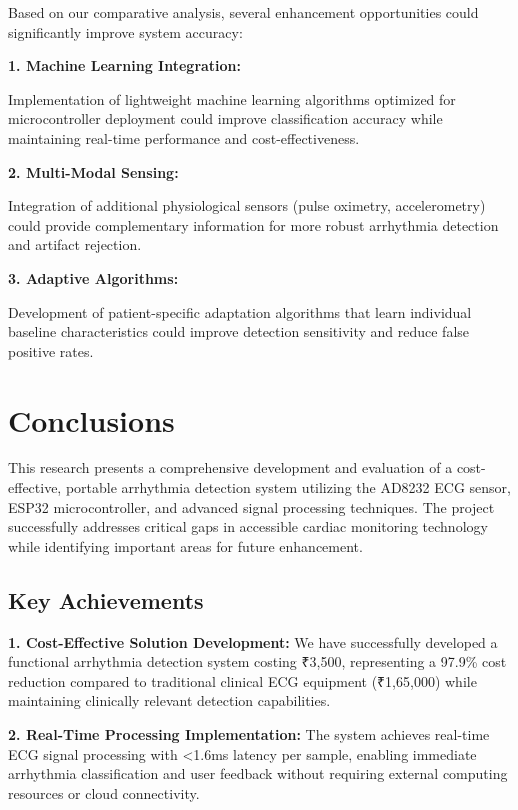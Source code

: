 \documentclass[12pt,a4paper]{article}
\begin{document}
Based on our comparative analysis, several enhancement opportunities could significantly improve system accuracy:

\vspace{0.5cm}

\textbf{1. Machine Learning Integration:}

Implementation of lightweight machine learning algorithms optimized for microcontroller deployment could improve classification accuracy while maintaining real-time performance and cost-effectiveness.

\vspace{0.3cm}

\textbf{2. Multi-Modal Sensing:}

Integration of additional physiological sensors (pulse oximetry, accelerometry) could provide complementary information for more robust arrhythmia detection and artifact rejection.

\vspace{0.3cm}

\textbf{3. Adaptive Algorithms:}

Development of patient-specific adaptation algorithms that learn individual baseline characteristics could improve detection sensitivity and reduce false positive rates.

\section{Conclusions}

This research presents a comprehensive development and evaluation of a cost-effective, portable arrhythmia detection system utilizing the AD8232 ECG sensor, ESP32 microcontroller, and advanced signal processing techniques. The project successfully addresses critical gaps in accessible cardiac monitoring technology while identifying important areas for future enhancement.

\subsection{Key Achievements}

\textbf{1. Cost-Effective Solution Development:}
We have successfully developed a functional arrhythmia detection system costing ₹3,500, representing a 97.9\% cost reduction compared to traditional clinical ECG equipment (₹1,65,000) while maintaining clinically relevant detection capabilities.

\textbf{2. Real-Time Processing Implementation:}
The system achieves real-time ECG signal processing with <1.6ms latency per sample, enabling immediate arrhythmia classification and user feedback without requiring external computing resources or cloud connectivity.
\end{document}
